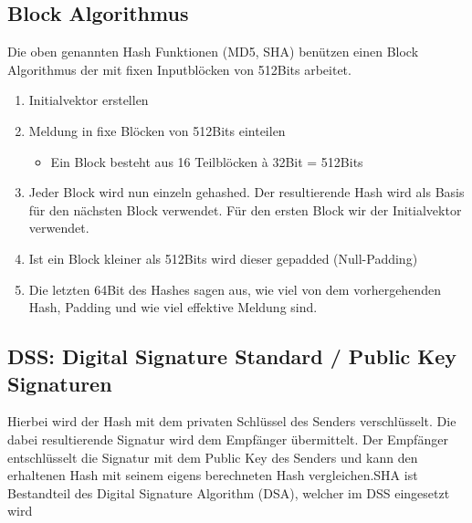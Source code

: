 \subsection{Block Algorithmus}
Die oben genannten Hash Funktionen (MD5, SHA) benützen einen Block Algorithmus der mit fixen Inputblöcken von 512Bits arbeitet.
\begin{enumerate}
	\item Initialvektor erstellen
	\item Meldung in fixe Blöcken von 512Bits einteilen
	\begin{itemize}
		\item Ein Block besteht aus 16 Teilblöcken à 32Bit = 512Bits
	\end{itemize}
	\item Jeder Block wird nun einzeln gehashed. Der resultierende Hash wird als Basis für den nächsten Block verwendet. Für den ersten Block wir der Initialvektor verwendet.
	\item Ist ein Block kleiner als 512Bits wird dieser gepadded (Null-Padding)
	\item Die letzten 64Bit des Hashes sagen aus, wie viel von dem vorhergehenden Hash, Padding und wie viel effektive Meldung sind.
\end{enumerate}

\subsection{DSS: Digital Signature Standard / Public Key Signaturen}
Hierbei wird der Hash mit dem privaten Schlüssel des Senders verschlüsselt. Die dabei resultierende Signatur wird dem Empfänger übermittelt. Der Empfänger entschlüsselt die Signatur mit dem Public Key des Senders und kann den erhaltenen Hash mit seinem eigens berechneten Hash vergleichen.SHA ist Bestandteil des Digital
Signature Algorithm (DSA), welcher im DSS eingesetzt wird

